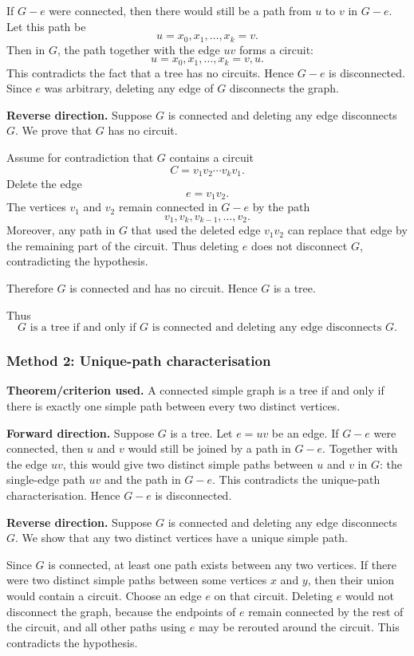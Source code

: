 \documentclass[12pt]{article}
\begin{document}
If $G-e$ were connected, then there would still be a path from $u$ to $v$ in $G-e$. Let this path be
\[
  u=x_0,x_1,\dots,x_k=v.
\]
Then in $G$, the path together with the edge $uv$ forms a circuit:
\[
  u=x_0,x_1,\dots,x_k=v,u.
\]
This contradicts the fact that a tree has no circuits. Hence $G-e$ is disconnected. Since $e$ was arbitrary, deleting any edge of $G$ disconnects the graph.

\medskip
\noindent
\textbf{Reverse direction.} Suppose $G$ is connected and deleting any edge disconnects $G$. We prove that $G$ has no circuit.

Assume for contradiction that $G$ contains a circuit
\[
  C=v_1v_2\cdots v_kv_1.
\]
Delete the edge
\[
  e=v_1v_2.
\]
The vertices $v_1$ and $v_2$ remain connected in $G-e$ by the path
\[
  v_1,v_k,v_{k-1},\dots,v_2.
\]
Moreover, any path in $G$ that used the deleted edge $v_1v_2$ can replace that edge by the remaining part of the circuit. Thus deleting $e$ does not disconnect $G$, contradicting the hypothesis.

Therefore $G$ is connected and has no circuit. Hence $G$ is a tree.

Thus
\[
  \boxed{G\text{ is a tree if and only if }G\text{ is connected and deleting any edge disconnects }G.}
\]

\subsubsection{Method 2: Unique-path characterisation}
\textbf{Theorem/criterion used.} A connected simple graph is a tree if and only if there is exactly one simple path between every two distinct vertices.

\medskip
\noindent
\textbf{Forward direction.} Suppose $G$ is a tree. Let $e=uv$ be an edge. If $G-e$ were connected, then $u$ and $v$ would still be joined by a path in $G-e$. Together with the edge $uv$, this would give two distinct simple paths between $u$ and $v$ in $G$: the single-edge path $uv$ and the path in $G-e$. This contradicts the unique-path characterisation. Hence $G-e$ is disconnected.

\medskip
\noindent
\textbf{Reverse direction.} Suppose $G$ is connected and deleting any edge disconnects $G$. We show that any two distinct vertices have a unique simple path.

Since $G$ is connected, at least one path exists between any two vertices. If there were two distinct simple paths between some vertices $x$ and $y$, then their union would contain a circuit. Choose an edge $e$ on that circuit. Deleting $e$ would not disconnect the graph, because the endpoints of $e$ remain connected by the rest of the circuit, and all other paths using $e$ may be rerouted around the circuit. This contradicts the hypothesis.
\end{document}
